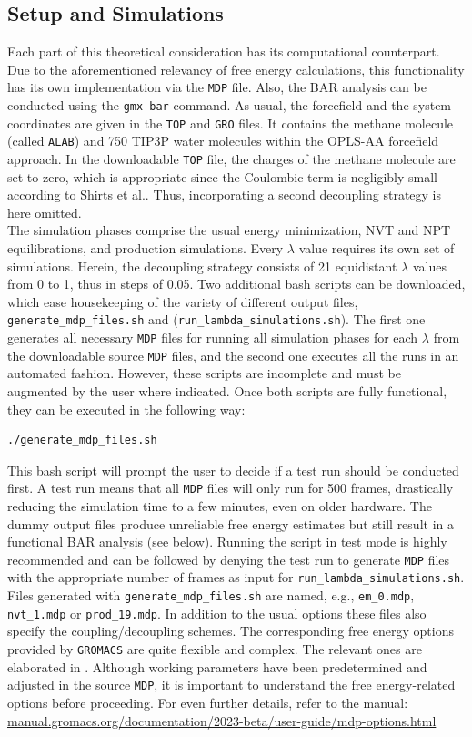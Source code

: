 \documentclass[9pt,tutorial]{livecoms}
\newcommand{\code}[1]{\colorbox{light-gray}{\texttt{#1}}}
\begin{document}
\subsection*{Setup and Simulations}
Each part of this theoretical consideration has its computational counterpart. Due to the aforementioned relevancy of free energy calculations, this functionality has its own implementation via the \texttt{MDP} file. Also, the BAR analysis can be conducted using the \code{gmx bar} command. As usual, the forcefield and the system coordinates are given in the \texttt{TOP} and \texttt{GRO} files. It contains the methane molecule (called \texttt{ALAB}) and 750 TIP3P water molecules within the OPLS-AA forcefield approach. In the downloadable \texttt{TOP} file, the charges of the methane molecule are set to zero, which is appropriate since the Coulombic term is negligibly small according to Shirts et al.\cite{Shirts_2003}. Thus, incorporating a second decoupling strategy is here omitted.\\
The simulation phases comprise the usual energy minimization, NVT and NPT equilibrations, and production simulations. Every $\lambda$ value requires its own set of simulations. Herein, the decoupling strategy consists of 21 equidistant $\lambda$ values from 0 to 1, thus in steps of \num{0.05}. 
Two additional bash scripts can be downloaded, which ease housekeeping of the variety of different output files, \texttt{generate\_mdp\_files.sh} and (\code{run\_lambda\_simulations.sh}). The first one generates all necessary \texttt{MDP} files for running all simulation phases for each $\lambda$ from the downloadable source \texttt{MDP} files, and the second one executes all the runs in an automated fashion. However, these scripts are incomplete and must be augmented by the user where indicated. Once both scripts are fully functional, they can be executed in the following way:
\begin{lstlisting}[language=bash]
./generate_mdp_files.sh
\end{lstlisting}
This bash script will prompt the user to decide if a test run should be conducted first. A test run means that all \texttt{MDP} files will only run for 500 frames, drastically reducing the simulation time to a few minutes, even on older hardware. The dummy output files produce unreliable free energy estimates but still result in a functional BAR analysis (see below). Running the script in test mode is highly recommended and can be followed by denying the test run to generate \texttt{MDP} files with the appropriate number of frames as input for \code{run\_lambda\_simulations.sh}. Files generated with \code{generate\_mdp\_files.sh} are named, e.g., \texttt{em\_0.mdp}, \texttt{nvt\_1.mdp} or \texttt{prod\_19.mdp}. In addition to the usual options these files also specify the coupling/decoupling schemes. The corresponding free energy options provided by \texttt{GROMACS} are quite flexible and complex. The relevant ones are elaborated in . Although working parameters have been predetermined and adjusted in the source \texttt{MDP}, it is important to understand the free energy-related options before proceeding. For even further details, refer to the manual: \url{manual.gromacs.org/documentation/2023-beta/user-guide/mdp-options.html}
\end{document}
